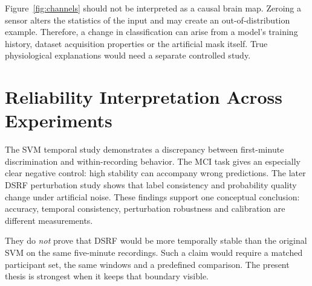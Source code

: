 
Figure~\ref{fig:channels} should not be interpreted as a causal brain map. Zeroing a sensor alters the statistics of the input and may create an out-of-distribution example. Therefore, a change in classification can arise from a model's training history, dataset acquisition properties or the artificial mask itself. True physiological explanations would need a separate controlled study.

\section{Reliability Interpretation Across Experiments}
The SVM temporal study demonstrates a discrepancy between first-minute discrimination and within-recording behavior. The MCI task gives an especially clear negative control: high stability can accompany wrong predictions. The later DSRF perturbation study shows that label consistency and probability quality change under artificial noise. These findings support one conceptual conclusion: accuracy, temporal consistency, perturbation robustness and calibration are different measurements.

They do \emph{not} prove that DSRF would be more temporally stable than the original SVM on the same five-minute recordings. Such a claim would require a matched participant set, the same windows and a predefined comparison. The present thesis is strongest when it keeps that boundary visible.
